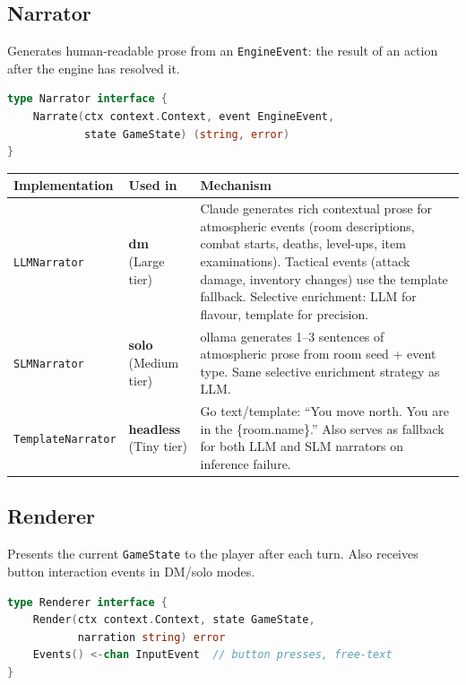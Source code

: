 \documentclass[a4paper,10pt]{article}
\newcommand{\mode}[1]{\textbf{#1}}
\begin{document}
\subsection{Narrator}

Generates human-readable prose from an \texttt{EngineEvent}: the
result of an action after the engine has resolved it.

\begin{lstlisting}[language=Go]
type Narrator interface {
    Narrate(ctx context.Context, event EngineEvent,
            state GameState) (string, error)
}
\end{lstlisting}

\begin{center}
\small
\begin{tabular}{lp{2.5cm}p{7cm}}
\toprule
\textbf{Implementation} & \textbf{Used in} & \textbf{Mechanism} \\
\midrule
\texttt{LLMNarrator}
  & \mode{dm} (Large tier)
  & Claude generates rich contextual prose for atmospheric events
    (room descriptions, combat starts, deaths, level-ups, item
    examinations).  Tactical events (attack damage, inventory
    changes) use the template fallback.  Selective enrichment:
    LLM for flavour, template for precision. \\
\texttt{SLMNarrator}
  & \mode{solo} (Medium tier)
  & ollama generates 1--3 sentences of atmospheric prose from room
    seed + event type.  Same selective enrichment strategy as LLM. \\
\texttt{Template\-Narrator}
  & \mode{headless} (Tiny tier)
  & Go text/template: ``You move north. You are in the
    \{room.name\}.''  Also serves as fallback for both LLM and SLM
    narrators on inference failure. \\
\bottomrule
\end{tabular}
\end{center}

\subsection{Renderer}

Presents the current \texttt{GameState} to the player after each
turn.  Also receives button interaction events in DM/solo modes.

\begin{lstlisting}[language=Go]
type Renderer interface {
    Render(ctx context.Context, state GameState,
           narration string) error
    Events() <-chan InputEvent  // button presses, free-text
}
\end{lstlisting}
\end{document}

